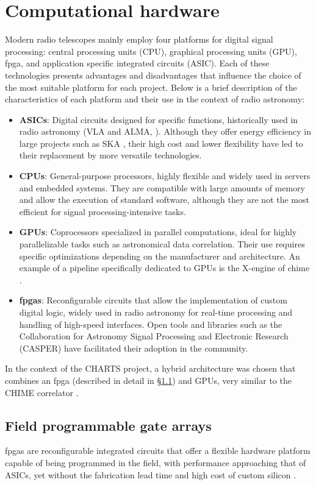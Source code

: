 \section{Computational hardware}
\label{sec:computational_hardware}
Modern radio telescopes mainly employ four platforms for digital signal processing: central processing units (CPU), graphical processing units (GPU), \Gls{fpga}, and application specific integrated circuits (ASIC). Each of these technologies presents advantages and disadvantages that influence the choice of the most suitable platform for each project. Below is a brief description of the characteristics of each platform and their use in the context of radio astronomy:
\begin{itemize}
	\item \textbf{ASICs}: Digital circuits designed for specific functions, historically used in radio astronomy (VLA and ALMA, \cite{Perley_2009,ALMA_correlator}). Although they offer energy efficiency in large projects such as SKA \citep{D_Addario_2016}, their high cost and lower flexibility have led to their replacement by more versatile technologies.
	\item \textbf{CPUs}: General-purpose processors, highly flexible and widely used in servers and embedded systems. They are compatible with large amounts of memory and allow the execution of standard software, although they are not the most efficient for signal processing-intensive tasks.
	\item \textbf{GPUs}: Coprocessors specialized in parallel computations, ideal for highly parallelizable tasks such as astronomical data correlation. Their use requires specific optimizations depending on the manufacturer and architecture. An example of a pipeline specifically dedicated to GPUs is the X-engine of \Gls{chime} \citep{recnik2015efficientrealtimedatapipeline}.
	\item \textbf{\Glspl{fpga}}: Reconfigurable circuits that allow the implementation of custom digital logic, widely used in radio astronomy for real-time processing and handling of high-speed interfaces. Open tools and libraries such as the Collaboration for Astronomy Signal Processing and Electronic Research (CASPER) have facilitated their adoption in the community.
\end{itemize}
In the context of the CHARTS project, a hybrid architecture was chosen that combines an \Gls{fpga} (described in detail in \S \ref{sec:fpgas}) and GPUs, very similar to the CHIME correlator \citep{CHIME2022}.
\subsection{Field programmable gate arrays}
\label{sec:fpgas}
\Glspl{fpga} are reconfigurable integrated circuits that offer a flexible hardware platform capable of being programmed in the field, with performance approaching that of ASICs, yet without the fabrication lead time and high cost of custom silicon \citep{kuon2008fpga}.

